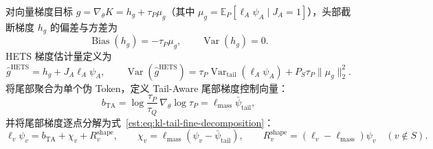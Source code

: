 \documentclass[lang=cn,scheme=chinese,openany]{elegantbook}
\newcommand{\E}{\mathbb E}
\newcommand{\Var}{\operatorname{Var}}
\newcommand{\tail}{\mathrm{tail}}
\begin{document}
对向量梯度目标 $g=\nabla_\theta K=h_g+\tau_P\mu_g$（其中 $\mu_g=\E_P[\ell_A\psi_A\mid J_A=1]$），头部截断梯度 $h_g$ 的偏差与方差为
\begin{equation}
 \operatorname{Bias}(h_g)=-\tau_P\mu_g,
 \qquad \Var(h_g)=0.
 \label{est:eq:chapter3-head-grad-bias}
\end{equation}
HETS 梯度估计量定义为
\begin{equation}
 \widehat g^{\mathrm{HETS}}=h_g+J_A \ell_A\psi_A,\qquad
 \Var(\widehat g^{\mathrm{HETS}})
 =\tau_P\Var_{\tail}(\ell_A\psi_A)+P_S\tau_P\lVert\mu_g\rVert_2^2.
 \label{est:eq:chapter3-hets-grad,est:eq:chapter3-hets-var}
\end{equation}
将尾部聚合为单个伪 Token，定义 Tail-Aware 尾部梯度控制向量：
\begin{equation}
 b_{\mathrm{TA}}=\log\frac{\tau_P}{\tau_Q}\,\nabla_\theta\log\tau_P=\ell_{\mathrm{mass}}\bar\psi_\tail,
 \label{est:eq:chapter3-resopd-control}
\end{equation}
并将尾部梯度逐点分解为式~\eqref{est:eq:kl-tail-fine-decomposition}：
\begin{equation}
 \ell_v\psi_v=b_{\mathrm{TA}}+\chi_v+R_v^{\mathrm{shape}},\qquad
 \chi_v=\ell_{\mathrm{mass}}(\psi_v-\bar\psi_{\tail}),\qquad
 R_v^{\mathrm{shape}}=(\ell_v-\ell_{\mathrm{mass}})\psi_v\quad(v\notin S).
 \label{est:eq:kl-tail-fine-decomposition}
\end{equation}
\end{document}

